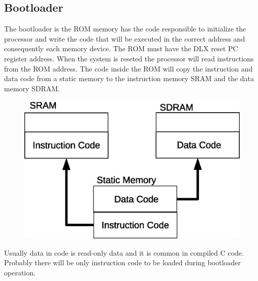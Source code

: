 \documentclass{article}
\begin{document}
  \newpage
  \subsection{Bootloader}
  The bootloader is the ROM memory has the code responsible to initialize the processor and write the code that will be executed in the correct address and consequently each memory device.
The ROM must have the DLX reset PC register address. When the system is reseted the processor will read instructions from the ROM address. The code inside the ROM will copy the instruction and data code from a static memory to the instruction memory SRAM and the data memory SDRAM.

  \begin{figure}[H]
    \centering
    \includegraphics[width=.7\linewidth]{pictures/bootloader.eps}
  \end{figure}  
  Usually data in code is read-only data and it is common in compiled C code. Probably there will be only instruction code to be loaded during bootloader operation.
  
  
    
% 
% 
\end{document}
